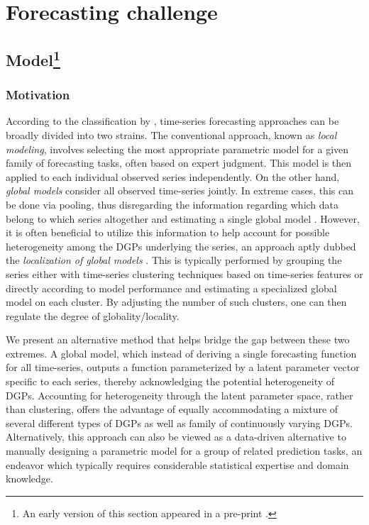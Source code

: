 \documentclass[3p,times,twocolumn]{elsarticle}
\begin{document}
\section{Forecasting challenge}\label{section:forecasting_challenge}
\subsection[Model]{Model\footnote{An early version of this section appeared in a pre-print \citet{stanekNoteM6Forecasting2023}.}}\label{subsectition:mtms_model}
\subsubsection{Motivation}

According to the classification by \citet{januschowskiCriteriaClassifyingForecasting2020}, time-series forecasting approaches can be broadly divided into two strains.
The conventional approach, known as \emph{local modeling}, involves selecting the most appropriate parametric model for a given family of forecasting tasks, often based on expert judgment. 
This model is then applied to each individual observed series independently. 
On the other hand, \emph{global models} consider all observed time-series jointly.
In extreme cases, this can be done via pooling, thus disregarding the information regarding which data belong to which series altogether and estimating a single global model \citep[see, e.g.,][]{montero-mansoPrinciplesAlgorithmsForecasting2021}.
However, it is often beneficial to utilize this information to help account for possible heterogeneity among the DGPs underlying the series, an approach aptly dubbed the \emph{localization of global models} \citep{godahewaEnsemblesLocalisedModels2021}. 
This is typically performed by grouping the series either with time-series clustering techniques based on time-series features \citep{bandaraForecastingTimeSeries2020} or directly according to model performance \citep{smylDataPreprocessingAugmentation2016, smylHybridMethodExponential2020} and estimating a specialized global model on each cluster. 
By adjusting the number of such clusters, one can then regulate the degree of globality/locality.

We present an alternative method that helps bridge the gap between these two extremes.
A global model, which instead of deriving a single forecasting function for all time-series, outputs a function parameterized by a latent parameter vector specific to each series, thereby acknowledging the potential heterogeneity of DGPs. 
Accounting for heterogeneity through the latent parameter space, rather than clustering, offers the advantage of equally accommodating a mixture of several different types of DGPs as well as family of continuously varying DGPs.
Alternatively, this approach can also be viewed as a data-driven alternative to manually designing a parametric model for a group of related prediction tasks, an endeavor which typically requires considerable statistical expertise and domain knowledge.
\end{document}
